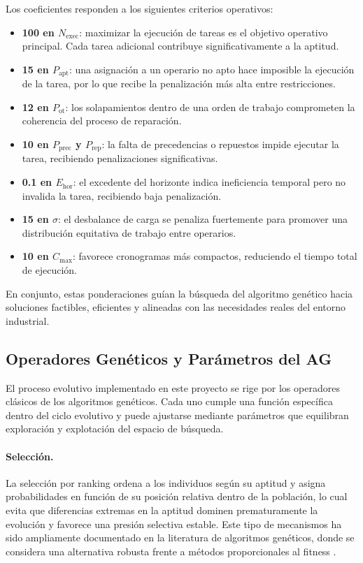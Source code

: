 Los coeficientes responden a los siguientes criterios operativos:
\begin{itemize}
    \item \textbf{100 en $N_{\text{exec}}$}: maximizar la ejecución de tareas es el objetivo operativo principal. Cada tarea adicional contribuye significativamente a la aptitud.
    \item \textbf{15 en $P_{\text{apt}}$}: una asignación a un operario no apto hace imposible la ejecución de la tarea, por lo que recibe la penalización más alta entre restricciones.
    \item \textbf{12 en $P_{\text{ot}}$}: los solapamientos dentro de una orden de trabajo comprometen la coherencia del proceso de reparación.
    \item \textbf{10 en $P_{\text{prec}}$ y $P_{\text{rep}}$}: la falta de precedencias o repuestos impide ejecutar la tarea, recibiendo penalizaciones significativas.
    \item \textbf{0.1 en $E_{\text{hor}}$}: el excedente del horizonte indica ineficiencia temporal pero no invalida la tarea, recibiendo baja penalización.
    \item \textbf{15 en $\sigma$}: el desbalance de carga se penaliza fuertemente para promover una distribución equitativa de trabajo entre operarios.
    \item \textbf{10 en $C_{\max}$}: favorece cronogramas más compactos, reduciendo el tiempo total de ejecución.
\end{itemize}

En conjunto, estas ponderaciones guían la búsqueda del algoritmo genético hacia soluciones 
factibles, eficientes y alineadas con las necesidades reales del entorno industrial.

\subsection{Operadores Genéticos y Parámetros del AG}

El proceso evolutivo implementado en este proyecto se rige por los operadores clásicos de los 
algoritmos genéticos. Cada uno cumple una función específica dentro del ciclo evolutivo y puede 
ajustarse mediante parámetros que equilibran exploración y explotación del espacio de búsqueda.

\paragraph{Selección.}
La selección por ranking ordena a los individuos según su aptitud y asigna probabilidades en 
función de su posición relativa dentro de la población, lo cual evita que diferencias extremas en 
la aptitud dominen prematuramente la evolución y favorece una presión selectiva estable. 
Este tipo de mecanismos ha sido ampliamente documentado en la literatura de algoritmos genéticos, 
donde se considera una alternativa robusta frente a métodos proporcionales al fitness \cite{ref3,ref4}.


